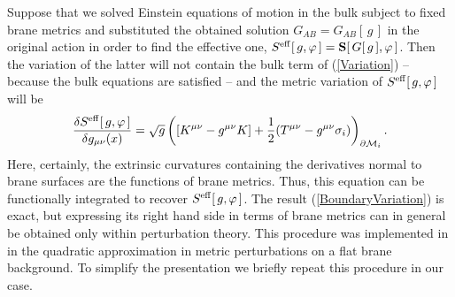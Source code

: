 \documentclass[a4paper,12pt]{article}
\newcommand{\dM}{{\partial \cal M}}
\begin{document}
Suppose that we solved Einstein equations of motion in the bulk
subject to fixed brane metrics and substituted the obtained
solution $G_{AB}=G_{AB}[\,g\,]$ in the original action in order to
find the effective one, $S^{\rm eff}[\,g,\varphi\,]={\mathbf
S}[\,G[\,g\,],\varphi\,]$. Then the variation of the latter will
not contain the bulk term of (\ref{Variation}) -- because the bulk
equations are satisfied -- and the metric variation of $S^{\rm
eff}[\,g,\varphi\,]$ will be
    \begin{eqnarray}
     \frac{\delta S^{\rm eff}[\,g,\varphi\,]}
     {\delta g_{\mu\nu}(x)}=
     \sqrt{g}\left([K^{\mu\nu}-g^{\mu\nu}K]
     +\frac12(T^{\mu\nu}
     -g^{\mu\nu}\sigma_i)
     \right)_{\dM_i}.       \label{BoundaryVariation}
    \end{eqnarray}
Here, certainly, the extrinsic curvatures containing the
derivatives normal to brane surfaces are the functions of brane
metrics. Thus, this equation can be functionally integrated to
recover $S^{\rm eff}[\,g,\varphi\,]$. The result
(\ref{BoundaryVariation}) is exact, but expressing its right hand
side in terms of brane metrics can in general be obtained only
within perturbation theory. This procedure was implemented in
\cite{BWEA} in the quadratic approximation in metric perturbations
on a flat brane background. To simplify the presentation we
briefly repeat this procedure in our case.
\end{document}
